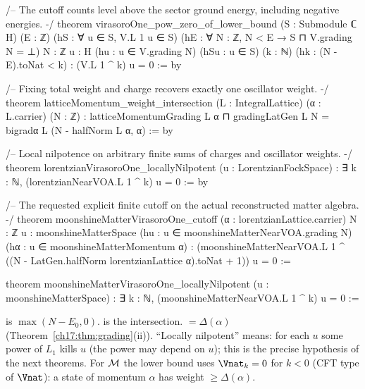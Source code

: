 \begin{leancode}
/-- The cutoff counts level above the sector ground energy, including negative energies. -/
theorem virasoroOne_pow_zero_of_lower_bound (S : Submodule ℂ H) (E : ℤ)
    (hS : ∀ u ∈ S, V.L 1 u ∈ S)
    (hE : ∀ N : ℤ, N < E → S ⊓ V.grading N = ⊥)
    {N : ℤ} {u : H} (hu : u ∈ V.grading N) (hSu : u ∈ S)
    (k : ℕ) (hk : (N - E).toNat < k) : (V.L 1 ^ k) u = 0 := by

/-- Fixing total weight and charge recovers exactly one oscillator weight. -/
theorem latticeMomentum_weight_intersection (L : IntegralLattice) (α : L.carrier) (N : ℤ) :
    latticeMomentumGrading L α ⊓ gradingLatGen L N =
      bigradα L (N - halfNorm L α, α) := by

/-- Local nilpotence on arbitrary finite sums of charges and oscillator weights. -/
theorem lorentzianVirasoroOne_locallyNilpotent (u : LorentzianFockSpace) :
    ∃ k : ℕ, (lorentzianNearVOA.L 1 ^ k) u = 0 := by

/-- The requested explicit finite cutoff on the actual reconstructed matter algebra. -/
theorem moonshineMatterVirasoroOne_cutoff (α : lorentzianLattice.carrier)
    {N : ℤ} {u : moonshineMatterSpace} (hu : u ∈ moonshineMatterNearVOA.grading N)
    (hα : u ∈ moonshineMatterMomentum α) :
    (moonshineMatterNearVOA.L 1 ^ ((N - LatGen.halfNorm lorentzianLattice α).toNat + 1)) u = 0 :=

theorem moonshineMatterVirasoroOne_locallyNilpotent (u : moonshineMatterSpace) :
    ∃ k : ℕ, (moonshineMatterNearVOA.L 1 ^ k) u = 0 :=
\end{leancode}

\begin{dictionary}
 is $\max(N-E_0,0)$.   is the intersection.   $=\Delta(\alpha)$
(Theorem~\ref{ch17:thm:grading}(ii)).  ``Locally nilpotent'' means: for each $u$ some power of $L_1$ kills $u$ (the power
may depend on $u$); this is the precise hypothesis  of the next theorems.  For $\mathcal{M}$ the lower bound
uses $\Vnat_k=0$ for $k<0$ (CFT type of $\Vnat$): a state of momentum $\alpha$ has weight $\ge \Delta(\alpha)$.
\end{dictionary}

